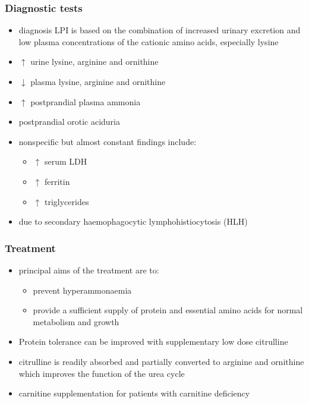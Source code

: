 \documentclass{scrartcl}
\begin{document}
\subsubsection{Diagnostic tests}
\label{sec:orgbdd4dd1}
\begin{itemize}
\item diagnosis LPI is based on the combination of increased urinary
excretion and low plasma concentrations of the cationic amino acids,
especially lysine
\item \(\uparrow\) urine lysine, arginine and ornithine
\item \(\downarrow\) plasma lysine, arginine and ornithine
\item \(\uparrow\) postprandial plasma ammonia
\item postprandial orotic aciduria
\item nonspecific but almost constant findings include:
\begin{itemize}
\item \(\uparrow\)  serum LDH
\item \(\uparrow\) ferritin
\item \(\uparrow\) triglycerides
\end{itemize}
\item due to secondary haemophagocytic lymphohistiocytosis (HLH)
\end{itemize}

\subsubsection{Treatment}
\label{sec:org634b38a}
\begin{itemize}
\item principal aims of the treatment are to:
\begin{itemize}
\item prevent hyperammonaemia
\item provide a sufficient supply of protein and essential amino acids
for normal metabolism and growth
\end{itemize}

\item Protein tolerance can be improved with supplementary low dose
citrulline
\item citrulline is readily absorbed and partially converted to arginine
and ornithine which improves the function of the urea cycle
\item carnitine supplementation for patients with carnitine deficiency
\end{itemize}
\end{document}
